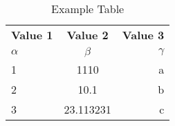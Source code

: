 \documentclass{article}
\begin{document}
\begin{table}[h!]
    \begin{center}
    \caption{Example Table}
    \label{tab:table1}
    \begin{tabular}{l|c|r} %
        \textbf{Value 1} & \textbf{Value 2} & \textbf{Value 3}\\
        $\alpha$ & $\beta$ & $\gamma$ \\
        \hline
        1 & 1110 & a\\
        2 & 10.1 & b\\
        3 & 23.113231 & c\\
    \end{tabular}
    \end{center}
\end{table}
\end{document}
